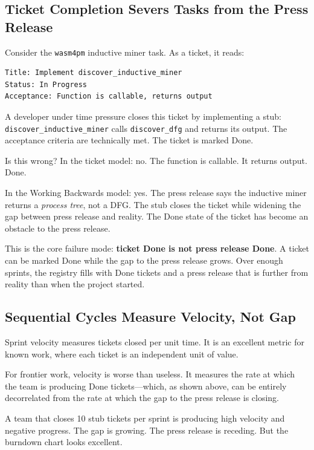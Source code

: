 \documentclass[11pt,a4paper]{article}
\newcommand{\code}[1]{\texttt{#1}}
\begin{document}
\subsection{Ticket Completion Severs Tasks from the Press Release}

Consider the \code{wasm4pm} inductive miner task.  As a ticket, it reads:

\begin{lstlisting}
Title: Implement discover_inductive_miner
Status: In Progress
Acceptance: Function is callable, returns output
\end{lstlisting}

A developer under time pressure closes this ticket by implementing a stub:
\code{discover\_inductive\_miner} calls \code{discover\_dfg} and returns its
output.  The acceptance criteria are technically met.  The ticket is marked
Done.

Is this wrong?  In the ticket model: no.  The function is callable.  It returns
output.  Done.

In the Working Backwards model: yes.  The press release says the inductive
miner returns a \emph{process tree}, not a DFG.  The stub closes the ticket
while widening the gap between press release and reality.  The Done state of
the ticket has become an obstacle to the press release.

This is the core failure mode: \textbf{ticket Done is not press release Done}.
A ticket can be marked Done while the gap to the press release grows.  Over
enough sprints, the registry fills with Done tickets and a press release that
is further from reality than when the project started.

\subsection{Sequential Cycles Measure Velocity, Not Gap}

Sprint velocity measures tickets closed per unit time.  It is an excellent
metric for known work, where each ticket is an independent unit of value.

For frontier work, velocity is worse than useless.  It measures the rate at
which the team is producing Done tickets---which, as shown above, can be
entirely decorrelated from the rate at which the gap to the press release is
closing.

A team that closes 10 stub tickets per sprint is producing high velocity and
negative progress.  The gap is growing.  The press release is receding.
But the burndown chart looks excellent.
\end{document}
